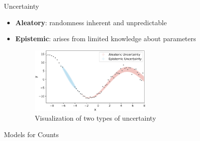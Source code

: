 \documentclass[english]{beamer}\usepackage[]{graphicx}\usepackage[]{xcolor}
\begin{document}
\begin{frame}{Uncertainty}

\begin{itemize}
\item \textbf{Aleatory}: randomness inherent and unpredictable
\item \textbf{Epistemic}: arises from limited knowledge about parameters

\begin{figure}[h]
    \centering
    \includegraphics[width=60mm,scale=0.7]{illustration_uncertainty.png}
    \caption{Visualization of two types of uncertainty \citep{yang2023explainable}}
    \label{fig:uncertainty}
\end{figure}


\end{itemize}


\end{frame}

\begin{frame}{Models for Counts}

\begin{table}[h!]
\centering
{}
\caption{Moments, aleatory and epistemic uncertainty in accrual shown by different models for counts.}
\label{tab:count_modeling}
\end{table}

\end{frame}
\end{document}
